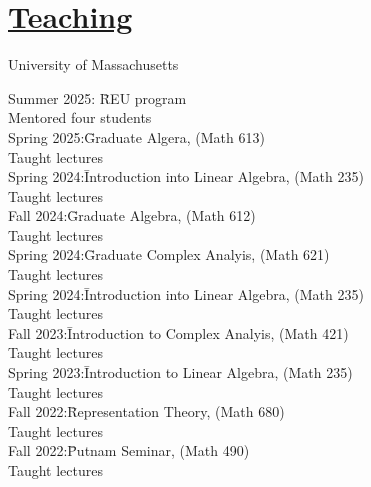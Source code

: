 \documentclass[11pt]{amsart}
\theoremstyle{plain}
\theoremstyle{definition}
\theoremstyle{remark}
\begin{document}
\medskip


\section*{ {\Large\underline{Teaching}}}
\noindent University of Massachusetts
\begin{tabbing}

Summer 2025: \quad\= REU program\\
\>Mentored four students \\
  
  
  Spring 2025:\quad\quad\= Graduate Algera, (Math 613)\\
\>Taught lectures \\

Spring 2024:\quad\quad\= Introduction into Linear Algebra, (Math 235)\\
\>Taught lectures \\


  

  Fall 2024:\quad\quad\= Graduate Algebra, (Math 612)\\
\>Taught lectures \\

  

Spring 2024:\quad\quad\= Graduate Complex Analyis, (Math 621)\\
\>Taught lectures \\

Spring 2024:\quad\quad\= Introduction into Linear Algebra, (Math 235)\\
\>Taught lectures \\



  
Fall 2023:\quad\quad\= Introduction to Complex Analyis, (Math 421)\\
\>Taught lectures \\

  
Spring 2023:\quad\quad\= Introduction to Linear Algebra, (Math 235)\\
\>Taught lectures \\




  
Fall 2022:\quad\quad\quad\= Representation Theory, (Math 680)\\
\>Taught lectures \\

  
Fall 2022:\quad\quad\quad\= Putnam Seminar, (Math 490)\\
\>Taught lectures \\



\end{tabbing}
\end{document}
